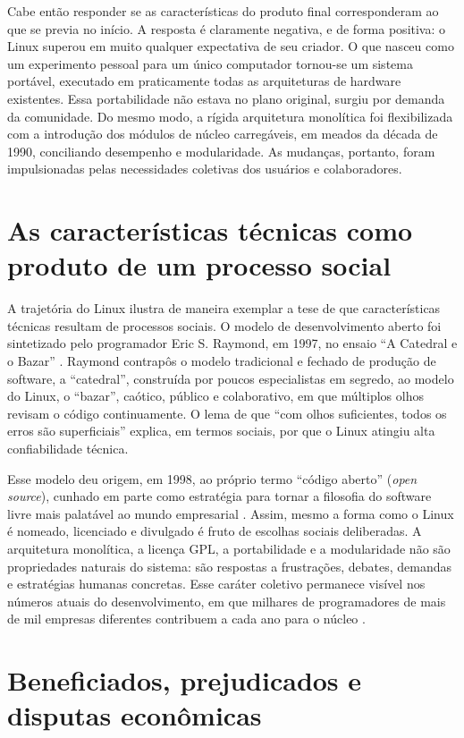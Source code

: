 \documentclass[12pt]{article}
\begin{document}
Cabe então responder se as características do produto final corresponderam ao que
se previa no início. A resposta é claramente negativa, e de forma positiva: o
Linux superou em muito qualquer expectativa de seu criador. O que nasceu como um
experimento pessoal para um único computador tornou-se um sistema portável,
executado em praticamente todas as arquiteturas de hardware existentes. Essa
portabilidade não estava no plano original, surgiu por demanda da comunidade. Do
mesmo modo, a rígida arquitetura monolítica foi flexibilizada com a introdução
dos módulos de núcleo carregáveis, em meados da década de 1990, conciliando
desempenho e modularidade. As mudanças, portanto, foram impulsionadas pelas
necessidades coletivas dos usuários e colaboradores.

\section{As características técnicas como produto de um processo social}

A trajetória do Linux ilustra de maneira exemplar a tese de que características
técnicas resultam de processos sociais. O modelo de desenvolvimento aberto foi
sintetizado pelo programador Eric S. Raymond, em 1997, no ensaio ``A Catedral e
o Bazar'' \cite{raymond2000}. Raymond contrapôs o modelo tradicional e fechado de
produção de software, a ``catedral'', construída por poucos especialistas em
segredo, ao modelo do Linux, o ``bazar'', caótico, público e colaborativo, em
que múltiplos olhos revisam o código continuamente. O lema de que ``com olhos
suficientes, todos os erros são superficiais'' explica, em termos sociais, por
que o Linux atingiu alta confiabilidade técnica.

Esse modelo deu origem, em 1998, ao próprio termo ``código aberto'' (\textit{open
source}), cunhado em parte como estratégia para tornar a filosofia do software
livre mais palatável ao mundo empresarial \cite{osi_history}. Assim, mesmo a
forma como o Linux é nomeado, licenciado e divulgado é fruto de escolhas sociais
deliberadas. A arquitetura monolítica, a licença GPL, a portabilidade e a
modularidade não são propriedades naturais do sistema: são respostas a
frustrações, debates, demandas e estratégias humanas concretas. Esse caráter
coletivo permanece visível nos números atuais do desenvolvimento, em que milhares
de programadores de mais de mil empresas diferentes contribuem a cada ano para o
núcleo \cite{kernel_about}.

\section{Beneficiados, prejudicados e disputas econômicas}
\end{document}

